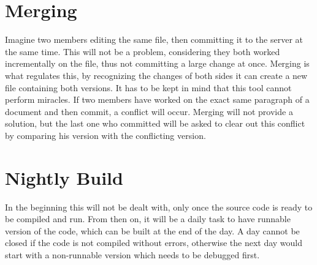 \section{Merging}
Imagine two members editing the same file, then committing it to the server at the same time.
This will not be a problem, considering they both worked incrementally on the file, thus not committing a large change at once.
Merging is what regulates this, by recognizing the changes of both sides it can create a new file containing both versions.
It has to be kept in mind that this tool cannot perform miracles.
If two members have worked on the exact same paragraph of a document and then commit, a conflict will occur.
Merging will not provide a solution, but the last one who committed will be asked to clear out this conflict by comparing his version with the conflicting version.

\section{Nightly Build}
In the beginning this will not be dealt with, only once the source code is ready to be compiled and run.
From then on, it will be a daily task to have runnable version of the code, which can be built at the end of the day.
A day cannot be closed if the code is not compiled without errors, otherwise the next day would start with a non-runnable version which needs to be debugged first.
